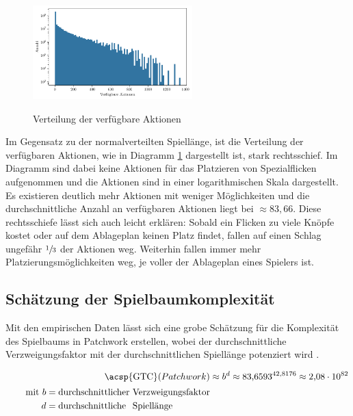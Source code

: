 \begin{figure}
    \vspace*{-0.75cm}
    \centering
    \includegraphics[width=0.549\textwidth]{res/pictures/plots/available_actions.pdf}
    \caption[Verteilung der verfügbare Aktionen]{\unskip}
    Verteilung der verfügbare Aktionen
    \label{fig:plot-available-actions-10-million}
    \vspace*{-0.85cm}
\end{figure}

Im Gegensatz zu der normalverteilten Spiellänge, ist die Verteilung der verfügbaren Aktionen, wie in Diagramm \ref{fig:plot-available-actions-10-million} dargestellt ist, stark rechtsschief. Im Diagramm sind dabei keine Aktionen für das Platzieren von Spezialflicken aufgenommen und die Aktionen sind in einer logarithmischen Skala dargestellt. Es existieren deutlich mehr Aktionen mit weniger Möglichkeiten und die durchschnittliche Anzahl an verfügbaren Aktionen liegt bei ${\approx}83{,}66$. Diese rechtsschiefe lässt sich auch leicht erklären: Sobald ein Flicken zu viele Knöpfe kostet oder auf dem Ablageplan keinen Platz findet, fallen auf einen Schlag ungefähr $\sfrac{1}{3}$ der Aktionen weg. Weiterhin fallen immer mehr Platzierungsmöglichkeiten weg, je voller der Ablageplan eines Spielers ist.

\subsection*{Schätzung der Spielbaumkomplexität}

Mit den empirischen Daten lässt sich eine grobe Schätzung für die Komplexität des Spielbaums in Patchwork erstellen, wobei der durchschnittliche Verzweigungsfaktor mit der durchschnittlichen Spiellänge potenziert wird \cite[S. 160]{1194.SearchAndAiInGames}.

\begin{align}
    \label{eqn:gtc-patchwork-branch-estimation}
    \text{\acsp{GTC}}(Patchwork) & \approx b^d \approx {83{,}6593}^{42{,}8176} \approx 2{,}08 \cdot 10^{82} \\[2pt]
    \tag*{$\text{mit }           b = \text{durchschnittlicher Verzweigungsfaktor}$}                         \\
    \tag*{$\phantom{\text{mit }} d = \text{durchschnittliche\phantom{r} \rlap{Spiellänge}\phantom{Verzweigungsfaktor}}$}
\end{align}

